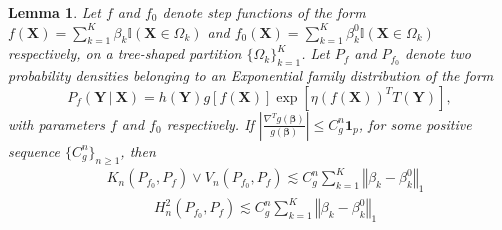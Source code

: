 \documentclass[12pt]{article}
\newcommand{\bm}[1]{\boldsymbol{#1}}
\newcommand{\Y}{\bm{Y}}
\newcommand{\norm}[1]{\left\Vert#1\right\Vert}
\newcommand{\abs}[1]{\left\vert#1\right\vert}
\newcommand{\1}{\mathbb{I}}
\def\C {\,|\:}
\def\C {\,|\:}
\def\b{\bm{\beta}}
\def\Y{\bm{Y}}
\def\X{\bm{X}}
\def\b{\bm{\beta}}
\def\C{\mbox{\boldmath$C$}}
\def\b{\mbox{\boldmath$b$}}
\def\X{\mbox{\boldmath$X$}}
\renewcommand{\Y}{\bm{Y}}
\def\C {\,|\:}
\def\C {\,|\:}
\def\b{\bm{\beta}}
\def\X{\bm{X}}
\def\b{\bm{\beta}}
\theoremstyle{plain}
\newtheorem{lemma}[theorem]{Lemma}
\theoremstyle{definition}
\theoremstyle{remark}
\begin{document}
\begin{lemma}
Let $f$ and $f_0$ denote step functions of the form $f(\X)=\sum_{k=1}^K\beta_k\mathbb{I}(\X\in\Omega_k)$ and $f_0(\X)=\sum_{k=1}^K\beta^0_k\mathbb{I}(\X\in\Omega_k)$ respectively, on a tree-shaped partition $\{\Omega_k\}_{k=1}^K$. Let $P_{f}$ and $P_{f_0}$ denote two probability densities belonging to an Exponential family distribution of the form 
\begin{equation}
    P_f(\Y \C \X)=h(\Y)g\left[f(\X)\right]\exp \left [\eta \left (f(\X) \right)^T T(\Y) \right],
\end{equation}
with parameters $f$ and $f_0$ respectively. If $\abs{\frac{\nabla^T g (\b)}{g(\b)}} \le C^n_{g} \textbf{1}_p$, for some positive sequence $\{C^n_{g}\}_{n \ge 1}$, then
\begin{align}\label{eq:KL_bound}
& K_n(P_{f_0}, P_f) \vee V_n(P_{f_0}, P_f)  \lesssim C^n_g \sum_{k=1}^K \norm{\beta_k-\beta^0_k}_1
\end{align}
\begin{align}\label{eq:Hellinger_bound}
& H_n^2(P_{f_0}, P_f)  \lesssim C^n_g \sum_{k=1}^K \norm{\beta_k-\beta^0_k}_1
\end{align}
\end{lemma}
\end{document}

